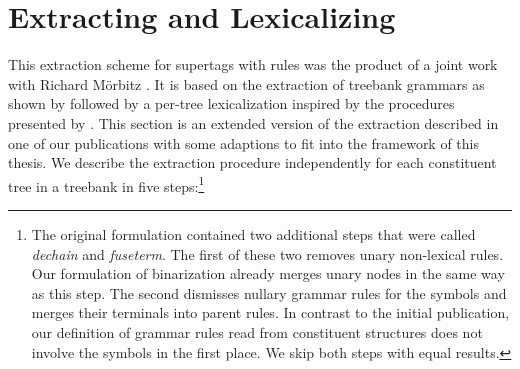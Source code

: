 \documentclass[../../document.tex]{subfiles}
\begin{document}
    \section{Extracting and Lexicalizing } \label{sec:extraction:lcfrs}
    This extraction scheme for supertags with  rules was the product of a joint work with Richard Mörbitz \citep{MoeRup20,RupMoe21}.
    It is based on the extraction of  treebank grammars as shown by \citet{KalMai13} followed by a per-tree lexicalization inspired by the procedures presented by \citet{EngMalMan18}.
    This section is an extended version of the extraction described in one of our publications \citep{RupMoe21} with some adaptions to fit into the framework of this thesis.
    We describe the extraction procedure independently for each constituent tree in a treebank in five steps:\footnote{\label{footnote:lcfrs:split}
        The original formulation contained two additional steps that were called \emph{dechain} and \emph{fuseterm}.
        The first of these two removes unary non-lexical rules.
        Our formulation of binarization already merges unary nodes in the same way as this step.
        The second dismisses nullary grammar rules for the  symbols and merges their terminals into parent rules.
        In contrast to the initial publication, our definition of grammar rules read from constituent structures does not involve the  symbols in the first place.
        We skip both steps with equal results.
    }
\end{document}
